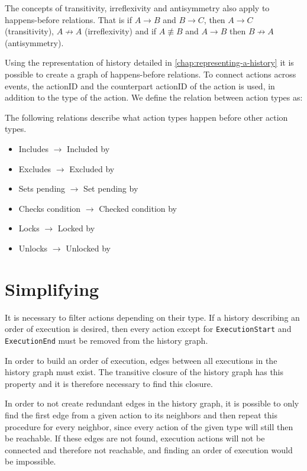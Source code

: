 	The concepts of transitivity, irreflexivity and antisymmetry also apply to happens-before relations. That is if $A \rightarrow B$ and $B \rightarrow C$, then $A \rightarrow C$ (transitivity), $A \not\rightarrow A$ (irreflexivity) and if $A \not\equiv B$ and $A \rightarrow B$ then $B \not\rightarrow A$ (antisymmetry).
	
	\newpar Using the representation of history detailed in \autoref{chap:representing-a-history} it is possible to create a graph of happens-before relations. To connect actions across events, the actionID and the counterpart actionID of the action is used, in addition to the type of the action. We define the relation between action types as:
	
	\begin{definition}
		The following relations describe what action types happen before other action types.
			\begin{itemize}
				\item Includes $\rightarrow$ Included by
				\item Excludes $\rightarrow$ Excluded by
				\item Sets pending $\rightarrow$ Set pending by
				\item Checks condition $\rightarrow$ Checked condition by
				\item Locks $\rightarrow$ Locked by
				\item Unlocks $\rightarrow$ Unlocked by
			\end{itemize}
	\end{definition}
	
	\section{Simplifying}
	It is necessary to filter actions depending on their type. If a history describing an order of execution is desired, then every action except for \texttt{ExecutionStart} and \texttt{ExecutionEnd} must be removed from the history graph. 
		
	\newpar In order to build an order of execution, edges between all executions in the history graph must exist. The transitive closure of the history graph has this property and it is therefore necessary to find this closure. 
	
	In order to not create redundant edges in the history graph, it is possible to only find the first edge from a given action to its neighbors and then repeat this procedure for every neighbor, since every action of the given type will still then be reachable. %
	If these edges are not found, execution actions will not be connected and therefore not reachable, and finding an order of execution would be impossible. %
	
